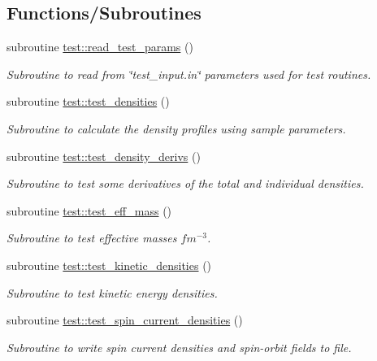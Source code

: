\subsection*{Functions/\+Subroutines}
\begin{DoxyCompactItemize}
\item 
subroutine \mbox{\hyperlink{namespacetest_a2d72f655d80bac0b01030b9cbda3518f}{test\+::read\+\_\+test\+\_\+params}} ()
\begin{DoxyCompactList}\small\item\em Subroutine to read from \char`\"{}test\+\_\+input.\+in\char`\"{} parameters used for test routines. \end{DoxyCompactList}\item 
subroutine \mbox{\hyperlink{namespacetest_ac81b1d59a968470b8ef8a165101df52c}{test\+::test\+\_\+densities}} ()
\begin{DoxyCompactList}\small\item\em Subroutine to calculate the density profiles using sample parameters. \end{DoxyCompactList}\item 
subroutine \mbox{\hyperlink{namespacetest_a50469f436f9c4caa447dafc48e311558}{test\+::test\+\_\+density\+\_\+derivs}} ()
\begin{DoxyCompactList}\small\item\em Subroutine to test some derivatives of the total and individual densities. \end{DoxyCompactList}\item 
subroutine \mbox{\hyperlink{namespacetest_ac49b81619b874cdd8276af19d24675cc}{test\+::test\+\_\+eff\+\_\+mass}} ()
\begin{DoxyCompactList}\small\item\em Subroutine to test effective masses $fm^{-3}$. \end{DoxyCompactList}\item 
subroutine \mbox{\hyperlink{namespacetest_a377babe07d6ab6f0791233afee079582}{test\+::test\+\_\+kinetic\+\_\+densities}} ()
\begin{DoxyCompactList}\small\item\em Subroutine to test kinetic energy densities. \end{DoxyCompactList}\item 
subroutine \mbox{\hyperlink{namespacetest_a3e49a3b6fd835efb13dd446bfb6e8b1f}{test\+::test\+\_\+spin\+\_\+current\+\_\+densities}} ()
\begin{DoxyCompactList}\small\item\em Subroutine to write spin current densities and spin-\/orbit fields to file. \end{DoxyCompactList}\item 

\end{DoxyCompactItemize}
